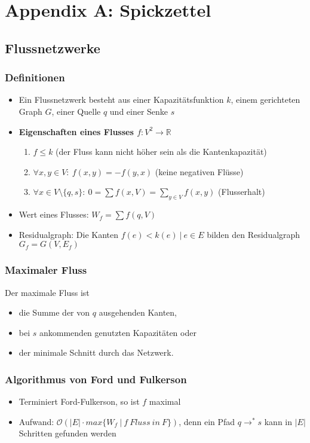 \section{Appendix A: Spickzettel}

\subsection{Flussnetzwerke}

\subsubsection{Definitionen}
\begin{itemize}
	\item Ein Flussnetzwerk besteht aus einer Kapazitätsfunktion \(k\), einem gerichteten Graph \(G\), einer Quelle \(q\) und einer Senke \(s\)
	\item \textbf{Eigenschaften eines Flusses \(f:V^2 \rightarrow \mathbb{R}\)}
	\begin{enumerate}
		\item \(f \leq k\) (der Fluss kann nicht höher sein als die Kantenkapazität)
		\item \(\forall x,y \in V:~f(x,y) = -f(y,x)\) (keine negativen Flüsse)
		\item \(\forall x \in V \setminus \{ q,s\}:~0 = \sum f(x,V) = \sum_{y \in V} f(x,y)\) (Flusserhalt)
	\end{enumerate}
	\item Wert eines Flusses: \(W_f = \sum f(q,V)\)
	\item Residualgraph: Die Kanten \(f(e) < k(e)~|~e \in E\) bilden den Residualgraph \(G_f = G(V,E_f)\)
\end{itemize}

\subsubsection{Maximaler Fluss}
Der maximale Fluss ist
\begin{itemize}
	\item die Summe der von \(q\) ausgehenden Kanten,
	\item bei \(s\) ankommenden genutzten Kapazitäten oder
	\item der minimale Schnitt durch das Netzwerk.
\end{itemize}

\subsubsection{Algorithmus von Ford und Fulkerson}
\begin{itemize}
	\item Terminiert Ford-Fulkerson, so ist \(f\) maximal
	\item Aufwand: \(\mathcal{O}(|E| \cdot max\{W_f~|~f~Fluss~in~F\})\), denn ein Pfad \(q \rightarrow^{*} s\) kann in \(|E|\) Schritten gefunden werden
\end{itemize}

